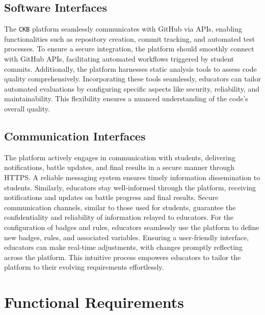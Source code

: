 \subsection{Software Interfaces}
\label{subsec:software_interfaces}%
The \verb|CKB| platform seamlessly communicates with GitHub via APIs, enabling functionalities such as repository creation, commit tracking, and automated test processes.
To ensure a secure integration, the platform should smoothly connect with GitHub APIs, facilitating automated workflows triggered by student commits.
Additionally, the platform harnesses static analysis tools to assess code quality comprehensively.
Incorporating these tools seamlessly, educators can tailor automated evaluations by configuring specific aspects like security, reliability, and maintainability. This flexibility ensures a nuanced understanding of the code's overall quality.

\subsection{Communication Interfaces}
\label{subsec:communication_interfaces}%
The platform actively engages in communication with students, delivering notifications, battle updates, and final results in a secure manner through HTTPS. A reliable messaging system ensures timely information dissemination to students.
Similarly, educators stay well-informed through the platform, receiving notifications and updates on battle progress and final results. Secure communication channels, similar to those used for students, guarantee the confidentiality and reliability of information relayed to educators.
For the configuration of badges and rules, educators seamlessly use the platform to define new badges, rules, and associated variables. Ensuring a user-friendly interface, educators can make real-time adjustments, with changes promptly reflecting across the platform. This intuitive process empowers educators to tailor the platform to their evolving requirements effortlessly.

\section{Functional Requirements}
\label{sec:functional_requirements}%

